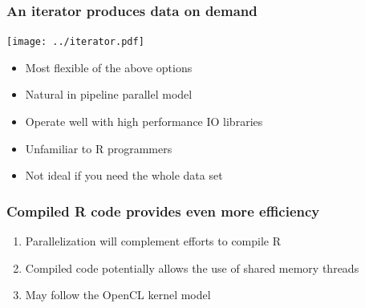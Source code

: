 \documentclass{beamer}
\begin{document}
\begin{frame}

    \frametitle{An iterator produces data on demand}

    \centerline{\texttt{[image: ../iterator.pdf]}}

    \begin{itemize}
        \item Most flexible of the above options
        \item Natural in pipeline parallel model
        \item Operate well with high performance IO libraries
    \end{itemize}

    \pause

    \begin{itemize}
        \item Unfamiliar to R programmers
        \item Not ideal if you need the whole data set
    \end{itemize}


%
%
%
%
%
%    
%


\end{frame}
\begin{frame}

    \frametitle{Compiled R code provides even more efficiency}

\begin{enumerate}
    \item Parallelization will complement efforts to compile R
    \item Compiled code potentially allows the use of shared memory threads
    \item May follow the OpenCL kernel model
\end{enumerate}

\end{frame}
\end{document}
